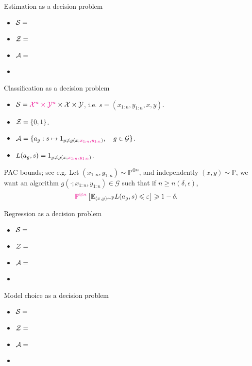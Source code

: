 \documentclass[10pt]{beamer}
\begin{document}
\begin{frame}{Estimation as a decision problem}
  \begin{itemize}
  \item $\mathcal{S} = $
  \item $\mathcal{Z} = $
  \item $\mathcal{A} = $
  \item
  \end{itemize}
  \blank
\end{frame}

\begin{frame}{Classification as a decision problem}
\begin{itemize}
\item $\mathcal{S} = \textcolor{magenta}{\mathcal{X}^n\times\mathcal{Y}^n}\times \mathcal{X}\times \mathcal{Y}$, i.e. $s = (x_{1:n}, y_{1:n}, x, y)$.
\item $\mathcal{Z} = \{0,1\}$.
\item $\mathcal{A} = \{a_g: s\mapsto 1_{y\neq g(x; \textcolor{magenta}{x_{1:n}, y_{1:n}})}, \quad g\in\mathcal{G}\}$.
\item $L(a_g,s) = 1_{y\neq g(x; \textcolor{magenta}{x_{1:n}, y_{1:n}})}$.
\end{itemize}
\vfill
\begin{block}{PAC bounds; see e.g. \citep{ShBe14}}
Let $(x_{1:n},y_{1:n})\sim \mathbb{P}^{\otimes n}$, and independently $(x,y)\sim \mathbb{P}$, we want an algorithm $g(\cdot; x_{1:n}, y_{1:n})\in\mathcal G$ such that if $n\geq n(\delta,\epsilon)$,
$$
\textcolor{magenta}{\mathbb{P}^{\otimes n}}\left[\mathbb{E}_{(x,y)\sim \mathbb P} L(a_g,s) \leqslant \varepsilon\right] \geqslant 1-\delta.
$$
\end{block}\end{frame}

\begin{frame}{Regression as a decision problem}
  \begin{itemize}
  \item $\mathcal{S} = $
  \item $\mathcal{Z} = $
  \item $\mathcal{A} = $
  \item
  \end{itemize}
  \blank
\end{frame}

\begin{frame}{Model choice as a decision problem}
    \begin{itemize}
      \item $\mathcal{S} = $
      \item $\mathcal{Z} = $
      \item $\mathcal{A} = $
      \item
      \end{itemize}
      \blank
    \end{frame}
\end{document}

